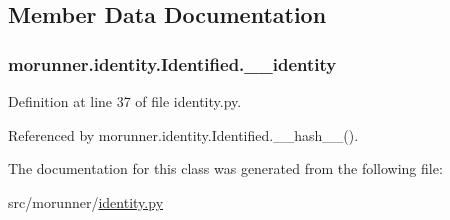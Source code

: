 \subsection{Member Data Documentation}
\hypertarget{classmorunner_1_1identity_1_1Identified_ac77d666680df7ce36c8839b6bb61a4d6}{}
\subsubsection[{\+\_\+\+\_\+identity}]{\setlength{\rightskip}{0pt plus 5cm}morunner.\+identity.\+Identified.\+\_\+\+\_\+identity\hspace{0.3cm}{\ttfamily [private]}}\label{classmorunner_1_1identity_1_1Identified_ac77d666680df7ce36c8839b6bb61a4d6}


Definition at line 37 of file identity.\+py.



Referenced by morunner.\+identity.\+Identified.\+\_\+\+\_\+hash\+\_\+\+\_\+().



The documentation for this class was generated from the following file\+:\begin{DoxyCompactItemize}
\item 
src/morunner/\hyperlink{identity_8py}{identity.\+py}\end{DoxyCompactItemize}

